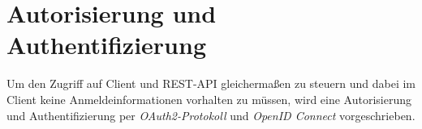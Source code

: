 \chapter{Autorisierung und Authentifizierung}

Um den Zugriff auf Client und REST-API gleichermaßen zu steuern und dabei im Client keine Anmeldeinformationen vorhalten zu müssen, wird eine Autorisierung und Authentifizierung per \textit{OAuth2-Protokoll} und \textit{OpenID Connect} vorgeschrieben.




%
